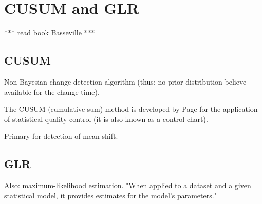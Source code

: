 \section{CUSUM and GLR}\label{cusum-glr}

*** read book Basseville \cite{basseville1993detection} ***


\subsection{CUSUM}
Non-Bayesian change detection algorithm (thus: no prior distribution believe available for the change time).

The CUSUM (cumulative sum) method is developed by Page \cite{page1954continuous} for the application of statistical quality control (it is also known as a control chart).

Primary for detection of mean shift.


\subsection{GLR}
Also: maximum-likelihood estimation. "When applied to a dataset and a given statistical model, it provides estimates for the model's parameters."